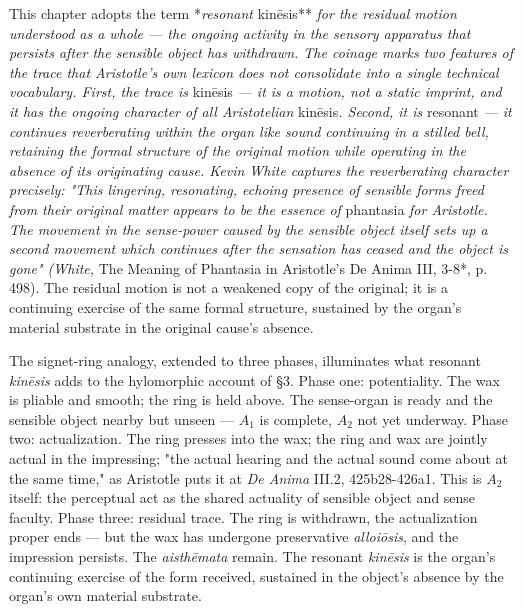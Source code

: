 \documentclass[12pt]{article}
\begin{document}
This chapter adopts the term *\textit{resonant }kinēsis**\textit{ for the residual motion understood as a whole --- the ongoing activity in the sensory apparatus that persists after the sensible object has withdrawn. The coinage marks two features of the trace that Aristotle's own lexicon does not consolidate into a single technical vocabulary. First, the trace is }kinēsis\textit{ --- it is a motion, not a static imprint, and it has the ongoing character of all Aristotelian }kinēsis\textit{. Second, it is }resonant\textit{ --- it continues reverberating within the organ like sound continuing in a stilled bell, retaining the formal structure of the original motion while operating in the absence of its originating cause. Kevin White captures the reverberating character precisely: "This lingering, resonating, echoing presence of sensible forms freed from their original matter appears to be the essence of }phantasia\textit{ for Aristotle. The movement in the sense-power caused by the sensible object itself sets up a second movement which continues after the sensation has ceased and the object is gone" (White, }The Meaning of Phantasia in Aristotle's De Anima III, 3-8*, p. 498). The residual motion is not a weakened copy of the original; it is a continuing exercise of the same formal structure, sustained by the organ's material substrate in the original cause's absence.

The signet-ring analogy, extended to three phases, illuminates what resonant \textit{kinēsis} adds to the hylomorphic account of §3. Phase one: potentiality. The wax is pliable and smooth; the ring is held above. The sense-organ is ready and the sensible object nearby but unseen --- $A_1$ is complete, $A_2$ not yet underway. Phase two: actualization. The ring presses into the wax; the ring and wax are jointly actual in the impressing; "the actual hearing and the actual sound come about at the same time," as Aristotle puts it at \textit{De Anima} III.2, 425b28-426a1. This is $A_2$ itself: the perceptual act as the shared actuality of sensible object and sense faculty. Phase three: residual trace. The ring is withdrawn, the actualization proper ends --- but the wax has undergone preservative \textit{alloiōsis}, and the impression persists. The \textit{aisthēmata} remain. The resonant \textit{kinēsis} is the organ's continuing exercise of the form received, sustained in the object's absence by the organ's own material substrate.
\end{document}
